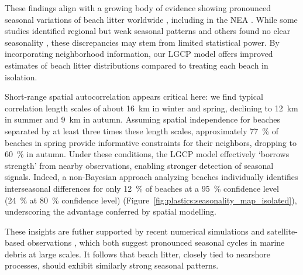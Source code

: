These findings align with a growing body of evidence showing pronounced seasonal variations of beach litter worldwide \cite{cheung_seasonal_2016,simeonova_seasonal_2017,pelamatti_seasonal_2019,orthodoxou_seasonal_2022}, including in the NEA \cite{gago_characteristics_2014,declerck_transport_2019,schulz_multi-criteria_2013,ruiz_modelling_2022,watts_through_2017,asensio-montesinos_seasonal_2019,rios_spatio-temporal_2018}. While some studies identified regional but weak seasonal patterns \cite{schulz_multi-criteria_2013} and others found no clear seasonality \cite{nelms_marine_2017}, these discrepancies may stem from limited statistical power. By incorporating neighborhood information, our LGCP model offers improved estimates of beach litter distributions compared to treating each beach in isolation. 

Short-range spatial autocorrelation appears critical here: we find typical correlation length scales of about \qty{16}{km} in winter and spring, declining to \qty{12}{km} in summer and \qty{9}{km} in autumn. Assuming spatial independence for beaches separated by at least three times these length scales, approximately \qty{77}{\percent} of beaches in spring provide informative constraints for their neighbors, dropping to \qty{60}{\percent} in autumn. Under these conditions, the LGCP model effectively `borrows strength' from nearby observations, enabling stronger detection of seasonal signals. Indeed, a non-Bayesian approach analyzing beaches individually identifies interseasonal differences for only \qty{12}{\percent} of beaches at a \qty{95}{\percent} confidence level (\qty{24}{\percent} at \qty{80}{\percent} confidence level) (Figure~\ref{fig:plastics:seasonality_map_isolated}), underscoring the advantage conferred by spatial modelling. 

These insights are futher supported by recent numerical simulations \cite{xu_seasonality_2024} and satellite-based observations \cite{cozar_proof_2024}, which both suggest pronounced seasonal cycles in marine debris at large scales. It follows that beach litter, closely tied to nearshore processes, should exhibit similarly strong seasonal patterns.


